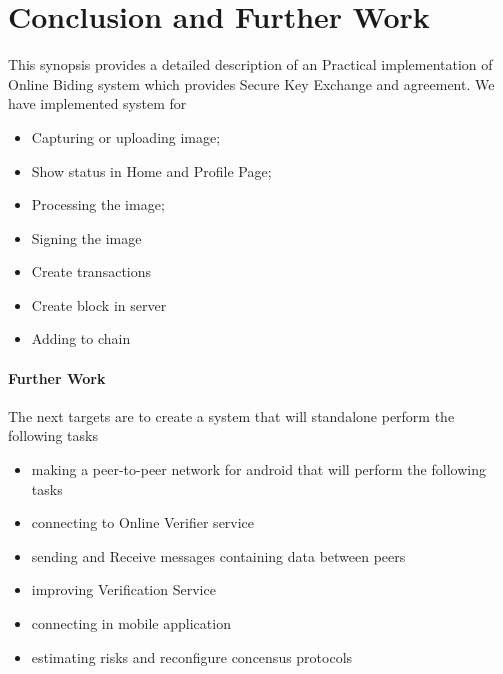 \chapter{Conclusion and Further Work}
\label{Ch6} This synopsis provides a detailed description of an Practical implementation of Online Biding system which provides Secure Key Exchange and agreement. We have implemented system for
\begin{itemize}
\item Capturing or uploading image;
\item Show status in Home and Profile Page;
\item Processing the image;
\item Signing the image
\item Create transactions
\item Create block in server
\item Adding to chain
\end{itemize}

\subsubsection{Further Work}
The next targets are to create a system that will standalone perform the following tasks
\begin{itemize}
\item making a peer-to-peer network for android that will perform the following tasks
\item connecting to Online Verifier service
\item sending and Receive messages containing data between peers
\item improving Verification Service
\item connecting in mobile application
\item estimating risks and reconfigure concensus protocols
\end{itemize}
